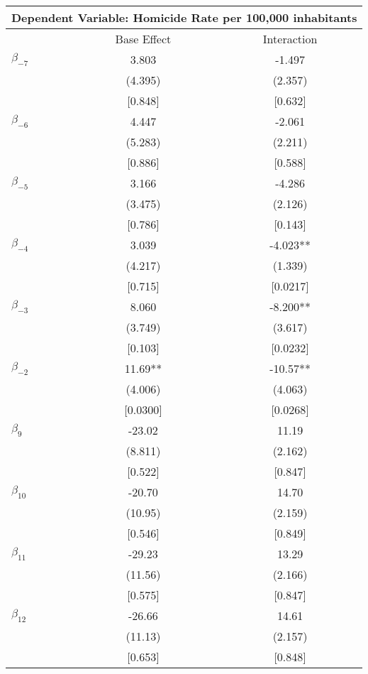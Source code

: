\documentclass[12pt]{article}
\begin{document}
\begin{table}[H]
\small
\begin{threeparttable}
\begin{tabular}{l@{\hspace{2em}}c@{\hspace{2em}}c}
\toprule
\multicolumn{3}{c}{Dependent Variable: Homicide Rate per 100,000 inhabitants} \\
\midrule
 & Base Effect & Interaction \\
\midrule
$\beta_{-7}$ & 3.803 & -1.497 \\
 & (4.395) & (2.357) \\
 & [0.848] & [0.632] \\[0.5em]
$\beta_{-6}$ & 4.447 & -2.061 \\
 & (5.283) & (2.211) \\
 & [0.886] & [0.588] \\[0.5em]
$\beta_{-5}$ & 3.166 & -4.286 \\
 & (3.475) & (2.126) \\
 & [0.786] & [0.143] \\[0.5em]
$\beta_{-4}$ & 3.039 & -4.023** \\
 & (4.217) & (1.339) \\
 & [0.715] & [0.0217] \\[0.5em]
$\beta_{-3}$ & 8.060 & -8.200** \\
 & (3.749) & (3.617) \\
 & [0.103] & [0.0232] \\[0.5em]
$\beta_{-2}$ & 11.69** & -10.57** \\
 & (4.006) & (4.063) \\
 & [0.0300] & [0.0268] \\[0.5em]
$\beta_{9}$ & -23.02 & 11.19 \\
 & (8.811) & (2.162) \\
 & [0.522] & [0.847] \\[0.5em]
$\beta_{10}$ & -20.70 & 14.70 \\
 & (10.95) & (2.159) \\
 & [0.546] & [0.849] \\[0.5em]
$\beta_{11}$ & -29.23 & 13.29 \\
 & (11.56) & (2.166) \\
 & [0.575] & [0.847] \\[0.5em]
$\beta_{12}$ & -26.66 & 14.61 \\
 & (11.13) & (2.157) \\
 & [0.653] & [0.848] \\

\end{tabular}
\end{threeparttable}
\end{table}
\end{document}

